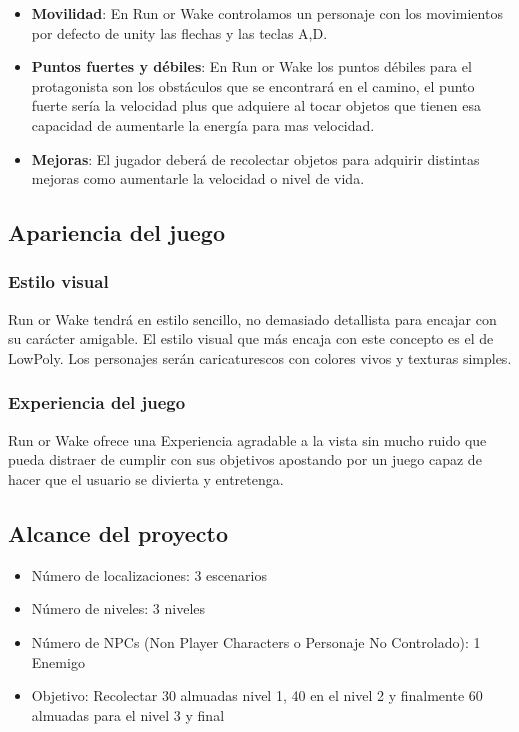 \begin{itemize}
	\item \textbf{Movilidad}: En Run or Wake controlamos un personaje
	      con los movimientos por defecto de unity las flechas y las teclas A,D.
	\item \textbf{Puntos fuertes y débiles}: En Run or Wake los puntos
	      débiles para el protagonista son los obstáculos que se encontrará
	      en el camino, el punto fuerte sería la velocidad plus que adquiere
	      al tocar objetos que tienen esa capacidad de aumentarle la energía
	      para mas velocidad.
	\item \textbf{Mejoras}: El jugador deberá de recolectar objetos para
	      adquirir distintas mejoras como aumentarle la velocidad o nivel de
	      vida.
\end{itemize}

\subsection{Apariencia del juego}
\subsubsection{Estilo visual}
Run or Wake tendrá en estilo sencillo, no demasiado detallista para encajar
con su carácter amigable. El estilo visual que más encaja con este concepto
es el de LowPoly. Los personajes serán caricaturescos con colores vivos y
texturas simples.

\subsubsection{Experiencia del juego}

Run or Wake ofrece una Experiencia agradable a la vista sin mucho ruido que
pueda distraer de cumplir con sus objetivos apostando por un juego capaz de
hacer que el usuario se divierta y entretenga.

\subsection{Alcance del proyecto}

\begin{itemize}
	\item Número de localizaciones: 3 escenarios
	\item Número de niveles: 3 niveles
	\item Número de NPCs (Non Player Characters o Personaje No Controlado): 1 Enemigo
	\item Objetivo: Recolectar 30 almuadas nivel 1, 40 en el nivel 2 y finalmente 60
	      almuadas para el nivel 3 y final
\end{itemize}
